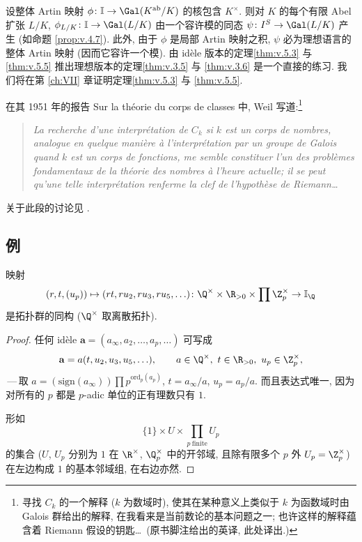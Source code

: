 \begin{remark}\label{rem:v.5.8}
设整体 Artin 映射 $\phi\colon\mathbb{I}\to\Gal(K^{\mathrm{ab}}/K)$ 的核包含 $K^{\times}$. 则对 $K$ 的每个有限 Abel 扩张 $L/K$, $\phi_{L/K}\colon\mathbb{I}\to\Gal(L/K)$ 由一个容许模的同态 $\psi\colon I^S\to\Gal(L/K)$ 产生 (如命题 \ref{prop:v.4.7}). 此外, 由于 $\phi$ 是局部 Artin 映射之积, $\psi$ 必为理想语言的整体 Artin 映射 (因而它容许一个模). 由 idèle 版本的定理\ref{thm:v.5.3} 与 \ref{thm:v.5.5} 推出理想版本的定理\ref{thm:v.3.5} 与 \ref{thm:v.3.6} 是一个直接的练习. 我们将在第 \ref{ch:VII} 章证明定理\ref{thm:v.5.3} 与 \ref{thm:v.5.5}.
\end{remark}

\label{pg:orig180}%
\begin{NOTES}
在其 1951 年的报告 Sur la théorie du corps de classes 中, Weil 写道:\footnote{寻找 $C_k$ 的一个解释 ($k$ 为数域时), 使其在某种意义上类似于 $k$ 为函数域时由 Galois 群给出的解释, 在我看来是当前数论的基本问题之一; 也许这样的解释蕴含着 Riemann 假设的钥匙\ldots\ (原书脚注给出的英译, 此处译出.)}
\begin{quote}
\itshape La recherche d'une interprétation de $C_k$ si $k$ est un corps de nombres, analogue en quelque manière \`a l'interprétation par un groupe de Galois quand $k$ est un corps de fonctions, me semble constituer l'un des problèmes fondamentaux de la théorie des nombres \`a l'heure actuelle; il se peut qu'une telle interprétation renferme la clef de l'hypothèse de Riemann\ldots
\end{quote}
\end{NOTES}
关于此段的讨论见 .

\subsection*{例}

\begin{lemma}\label{lem:v.5.9}
映射
\[
(r,t,(u_p))\mapsto(rt,ru_2,ru_3,ru_5,\ldots)\colon\Q^{\times}\times\R_{>0}\times\prod\Z_p^{\times}\to\mathbb{I}_{\Q}
\]
是拓扑群的同构 ($\Q^{\times}$ 取离散拓扑).
\end{lemma}

\begin{proof}
任何 idèle $\mathbf{a}=(a_\infty,a_2,\ldots,a_p,\ldots)$ 可写成
\[
\mathbf{a}=a(t,u_2,u_3,u_5,\ldots),\qquad a\in\Q^{\times},\ t\in\R_{>0},\ u_p\in\Z_p^{\times},
\]
\,---\,取 $a=(\mathrm{sign}(a_\infty))\prod p^{\mathrm{ord}_p(a_p)}$, $t=a_\infty/a$, $u_p=a_p/a$. 而且表达式唯一, 因为对所有的 $p$ 都是 $p$-adic 单位的正有理数只有 $1$.

形如
\[
\{1\}\times U\times\prod_{p\ \mathrm{finite}}U_p
\]
的集合 ($U$, $U_p$ 分别为 $1$ 在 $\R^{\times}$, $\Q_p^{\times}$ 中的开邻域, 且除有限多个 $p$ 外 $U_p=\Z_p^{\times}$) 在左边构成 $1$ 的基本邻域组, 在右边亦然.
\end{proof}


